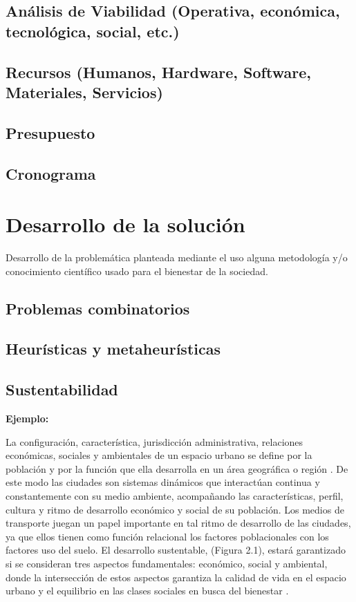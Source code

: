 \subsection{Análisis de Viabilidad (Operativa, económica, tecnológica, social, etc.)}

\subsection{Recursos (Humanos, Hardware, Software, Materiales, Servicios)}

\subsection{Presupuesto}

\subsection{Cronograma}


\section{Desarrollo de la solución}
Desarrollo de la problemática planteada mediante el uso alguna metodología y/o conocimiento científico usado para el bienestar de la sociedad.


\subsection{Problemas combinatorios}
\subsection{Heurísticas y metaheurísticas}

\subsection{Sustentabilidad}

{\bf Ejemplo:}\par

La configuración, característica, jurisdicción administrativa, relaciones económicas, sociales y ambientales de un espacio urbano se define por la población y por la función que ella desarrolla en un área geográfica o región \citep{Bugliarello}. De este modo las ciudades son sistemas dinámicos que interactúan continua y constantemente con su medio ambiente, acompañando las características, perfil, cultura y ritmo de desarrollo económico y social de su población. Los medios de transporte juegan un papel importante en tal ritmo de desarrollo de las ciudades, ya que ellos tienen como función relacional los factores poblacionales con los factores uso del suelo.  
\vskip 1cm
El desarrollo sustentable, (Figura 2.1), estará garantizado si se consideran tres aspectos fundamentales: económico, social y ambiental, donde la intersección de estos aspectos garantiza la calidad de vida en el espacio urbano y el equilibrio en las clases sociales en busca del bienestar \citep{Tanguay}.

